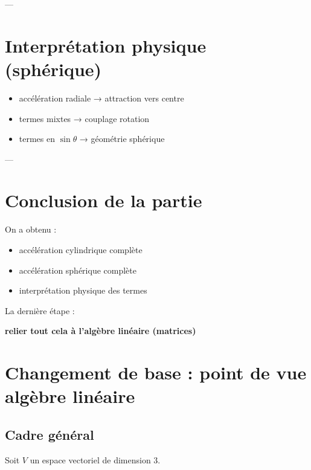 \documentclass[11pt,a4paper]{article}
\begin{document}
---

\section{Interprétation physique (sphérique)}

\begin{itemize}
\item accélération radiale → attraction vers centre
\item termes mixtes → couplage rotation
\item termes en $\sin\theta$ → géométrie sphérique
\end{itemize}

---

\section{Conclusion de la partie}

On a obtenu :

\begin{itemize}
\item accélération cylindrique complète
\item accélération sphérique complète
\item interprétation physique des termes
\end{itemize}

\bigskip

 La dernière étape :

\begin{center}
\textbf{relier tout cela à l’algèbre linéaire (matrices)}
\end{center}

\section{Changement de base : point de vue algèbre linéaire}

\subsection{Cadre général}

Soit $V$ un espace vectoriel de dimension 3.
\end{document}
